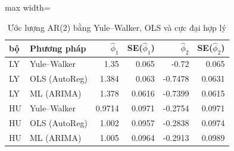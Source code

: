 \begin{table}[H]
\centering\small
\caption{Ước lượng AR(2) bằng Yule–Walker, OLS và cực đại hợp lý}\label{tab:tab_b11_12_estimators}
\begin{adjustbox}{max width=\linewidth}
\begin{tabular}{llrrrr}
\toprule
bộ & Phương pháp & $\hat{\phi}_{1}$ & SE($\hat{\phi}_{1}$) & $\hat{\phi}_{2}$ & SE($\hat{\phi}_{2}$) \\
\midrule
LY & Yule–Walker & 1.35 & 0.065 & -0.72 & 0.065 \\
LY & OLS (AutoReg) & 1.384 & 0.063 & -0.7478 & 0.0631 \\
LY & ML (ARIMA) & 1.378 & 0.0616 & -0.7399 & 0.0615 \\
HU & Yule–Walker & 0.9714 & 0.0971 & -0.2754 & 0.0971 \\
HU & OLS (AutoReg) & 1.002 & 0.0957 & -0.2838 & 0.0974 \\
HU & ML (ARIMA) & 1.005 & 0.0964 & -0.2913 & 0.0989 \\
\bottomrule
\end{tabular}
\end{adjustbox}\par{}
\end{table}
